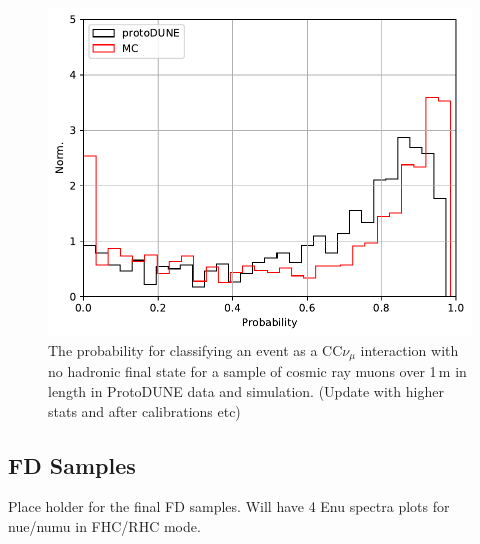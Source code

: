 \begin{figure}
    \centering
    \includegraphics[scale=0.5]{graphics/cvn_protodata_mc.pdf}
    \caption{The probability for classifying an event as a CC$\nu_\mu$ interaction with no hadronic final state for a sample of cosmic ray muons over 1\,m in length in ProtoDUNE data and simulation. (Update with higher stats and after calibrations etc)}
    \label{fig:protodunecvn}
\end{figure}

\subsection{FD Samples}

Place holder for the final FD samples. Will have 4 Enu spectra plots for nue/numu in FHC/RHC mode.


